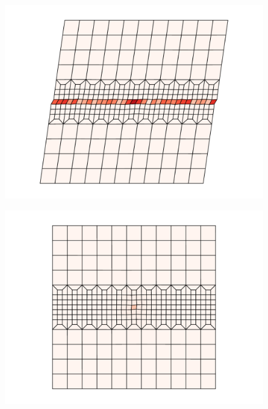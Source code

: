 \documentclass[fleqn]{goose-article}
\begin{document}
\begin{figure}[htp]
    \centering
    \captionsetup[subfigure]{justification=centering}
    \begin{minipage}[t]{.3\textwidth}
        \centering
        \includegraphics[width=\textwidth]{example_start.pdf}
        \label{fig:example:start}
    \end{minipage}
    \hfill
    \begin{minipage}[t]{.3\textwidth}
        \centering
        \includegraphics[width=\textwidth]{example_perturbation.pdf}
        \label{fig:example:perturbation}
    \end{minipage}

\end{figure}
\end{document}

